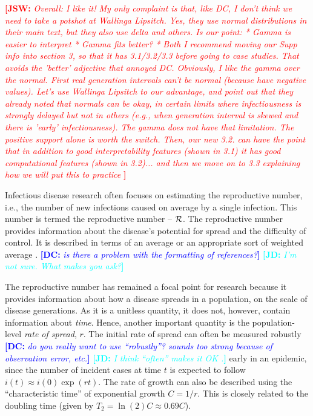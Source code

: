 \documentclass[12pt]{article}
\newcommand{\RR}{\ensuremath{{\cal R}}}
\newcommand{\Tc}{\ensuremath{C}}
\newcommand{\comment}[3]{\textcolor{#1}{\textbf{[#2: }\textit{#3}\textbf{]}}}
\newcommand{\jd}[1]{\comment{cyan}{JD}{#1}}
\newcommand{\dc}[1]{\comment{blue}{DC}{#1}}
\newcommand{\jsw}[1]{\comment{red}{JSW}{#1}}
\begin{document}
\jsw{
Overall: I like it!
My only complaint is that, like DC, I don't think we need to take a potshot at Wallinga Lipsitch. Yes, they use normal distributions in their main text, but they also use delta and others. Is our point:
* Gamma is easier to interpret
* Gamma fits better?
* Both
I recommend moving our Supp info into section 3, so that it has 3.1/3.2/3.3 before going to case studies. That avoids the 'better' adjective that annoyed DC. 
Obviously, I like the gamma over the normal. First real generation intervals can't be normal (because have negative values). Let's use Wallinga Lipsitch to our advantage, and point out that they already noted that normals can be okay, in certain limits where infectiousness is strongly delayed but not in others (e.g., when generation interval is skewed and there is 'early' infectiousness). The gamma does not have that limitation. The positive support alone is worth the switch. Then, our new 3.2. can have the point that in addition to good interpretability features (shown in 3.1) it has good computational features (shown in 3.2)... and then we move on to 3.3 explaining how we will put this to practice
}

Infectious disease research often focuses on estimating the reproductive number, i.e., the number of new infections caused on average by a single infection.
This number is termed the reproductive number -- \RR.
The reproductive number provides information about the disease's potential for spread and the difficulty of control.
It is described in terms of an average \cite{AndeMay91} or an appropriate sort of weighted average \cite{DiekHees90}.
\dc{is there a problem with the formatting of references?}
\jd{I'm not sure. What makes you ask?}

The reproductive number has remained a focal point for research because it provides information about how a disease spreads in a population, on the scale of disease generations.
As it is a unitless quantity, it does not, however, contain information about \emph{time}.
Hence, another important quantity is the population-level \emph{rate of spread}, $r$. The initial rate of spread can often be measured robustly \dc{do you really want to use ``robustly''? sounds too strong because of observation error, etc.}
\jd{I think ``often'' makes it OK .}
early in an epidemic, since the number of incident cases at time $t$ is expected to follow $i(t) \approx i(0) \exp(r t)$. The rate of growth can also be described using the ``characteristic time'' of exponential growth $\Tc = 1/r$. This is closely related to the doubling time (given by $T_2 = \ln(2) \Tc \approx 0.69 \Tc$).
\end{document}
